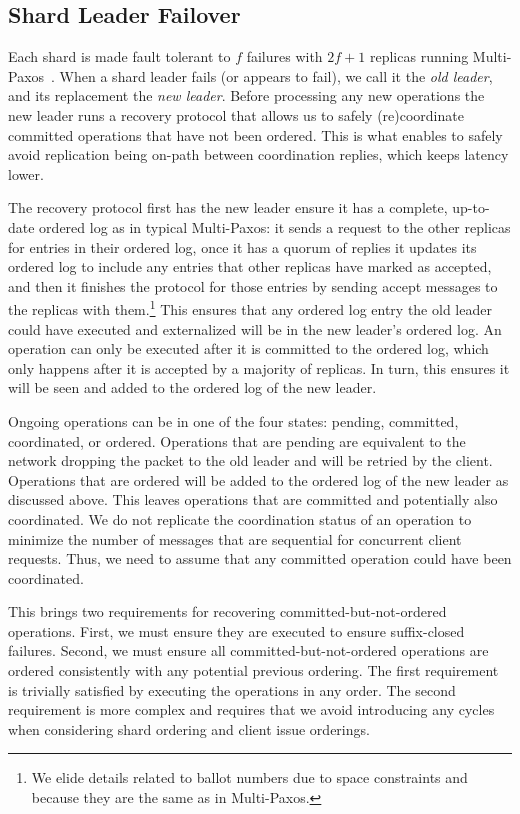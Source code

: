 \subsection{Shard Leader Failover}
\label{subsec:leaderfailures}
Each shard is made fault tolerant to $f$ failures with $2f+1$ replicas running Multi-Paxos~\cite{lamport1998paxos}.
When a shard leader fails (or appears to fail), we call it the \textit{old leader}, and its replacement the \textit{new leader}.
Before processing any new operations the new leader runs a recovery protocol that allows us to safely (re)coordinate committed operations that have not been ordered.
This is what enables \sys{} to safely avoid replication being on-path between coordination replies, which keeps latency lower.

The recovery protocol first has the new leader ensure it has a complete, up-to-date ordered log as in typical Multi-Paxos:
it sends a request to the other replicas for entries in their ordered log,
once it has a quorum of replies it updates its ordered log to include any entries that other replicas have marked as accepted,
and then it finishes the protocol for those entries by sending accept messages to the replicas with them.\footnote{We elide details related to ballot numbers due to space constraints and because they are the same as in Multi-Paxos.}
This ensures that any ordered log entry the old leader could have executed and externalized will be in the new leader's ordered log.
An operation can only be executed after it is committed to the ordered log,
which only happens after it is accepted by a majority of replicas. In turn, this
ensures it will be seen and added to the ordered log of the new leader.

Ongoing operations can be in one of the four states: pending, committed, coordinated, or ordered.
Operations that are pending are equivalent to the network dropping the packet to the old leader and will be retried by the client.
Operations that are ordered will be added to the ordered log of the new leader as discussed above.
This leaves operations that are committed and potentially also coordinated.
We do not replicate the coordination status of an operation to minimize the number of messages that are sequential for concurrent client requests.
Thus, we need to assume that any committed operation could have been coordinated.

This brings two requirements for recovering committed-but-not-ordered operations.
First, we must ensure they are executed to ensure suffix-closed failures.
%
Second, we must ensure all committed-but-not-ordered operations are ordered consistently with any potential previous ordering.
The first requirement is trivially satisfied by executing the operations in any order.
The second requirement is more complex and requires that we avoid introducing any cycles when considering shard ordering and client issue orderings.


